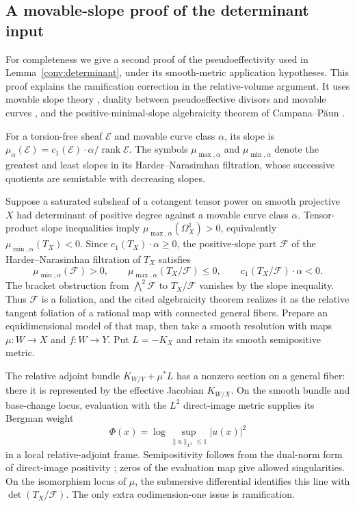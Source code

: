 \subsection{A movable-slope proof of the determinant input}
\label{conv:determinant-slope}

For completeness we give a second proof of the pseudoeffectivity used
in Lemma~\ref{conv:determinant}, under its smooth-metric application
hypotheses.  This proof explains the ramification correction in the
relative-volume argument.  It uses movable slope theory
\cite{GrebKebekusPeternell2016}, duality between pseudoeffective divisors
and movable curves \cite{BDPP2013}, and the positive-minimal-slope
algebraicity theorem of Campana--P\u aun
\cite[Theorem~1.1]{CampanaPaun2019}.

For a torsion-free sheaf $\mathcal E$ and movable curve class $\alpha$,
its slope is $\mu_\alpha(\mathcal E)=c_1(\mathcal E)\cdot\alpha/
\operatorname{rank}\mathcal E$.  The symbols $\mu_{\max,\alpha}$ and
$\mu_{\min,\alpha}$ denote the greatest and least slopes in its
Harder--Narasimhan filtration, whose successive quotients are
semistable with decreasing slopes.

Suppose a saturated subsheaf of a cotangent tensor power on smooth
projective $X$ had determinant of positive degree against a movable
curve class $\alpha$.  Tensor-product slope inequalities imply
$\mu_{\max,\alpha}(\Omega_X^1)>0$, equivalently
$\mu_{\min,\alpha}(T_X)<0$.  Since $c_1(T_X)\cdot\alpha\ge0$,
the positive-slope part $\mathcal F$ of the Harder--Narasimhan
filtration of $T_X$ satisfies
\[
 \mu_{\min,\alpha}(\mathcal F)>0,
 \qquad\mu_{\max,\alpha}(T_X/\mathcal F)\le0,
 \qquad c_1(T_X/\mathcal F)\cdot\alpha<0.
\]
The bracket obstruction from $\bigwedge^2\mathcal F$ to
$T_X/\mathcal F$ vanishes by the slope inequality.  Thus $\mathcal F$
is a foliation, and the cited algebraicity theorem realizes it as the
relative tangent foliation of a rational map with connected general
fibers.  Prepare an equidimensional model of that map, then take a
smooth resolution with maps $\mu:W\to X$ and $f:W\to Y$.
Put $L=-K_X$ and retain its smooth semipositive metric.

The relative adjoint bundle $K_{W/Y}+\mu^*L$ has a nonzero section on
a general fiber: there it is represented by the effective Jacobian
$K_{W/X}$.  On the smooth bundle and base-change locus, evaluation
with the $L^2$ direct-image metric supplies its Bergman weight
\[
 \Phi(x)=\log\sup_{\|u\|_{L^2}\le1}|u(x)|^2
\]
in a local relative-adjoint frame.  Semipositivity follows from the
dual-norm form of direct-image positivity
\cite{Berndtsson2009,Berndtsson2011}; zeros of the evaluation map give
allowed singularities.  On the isomorphism locus of $\mu$, the
submersive differential identifies this line with
$\det(T_X/\mathcal F)$.  The only extra codimension-one issue is
ramification.

